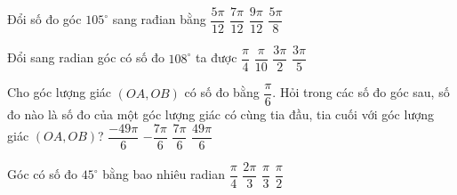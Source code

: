 \begin{ex}%
	Đổi số đo góc  $105^{\circ}$ sang rađian bằng
	 \choice
		{$\dfrac{5\pi}{12}$} 
		{\True  $\dfrac{7\pi}{12}$}
		{$\dfrac{9\pi}{12}$} 
		 {$\dfrac{5\pi}{8}$}
	 \loigiai{
		\[105^{\circ}=\dfrac{105^{\circ}\cdot  \pi}{180^{\circ}}=\dfrac{7\pi}{12}.
		\] 
	} 
\end{ex}

\begin{ex}%
	Đổi sang radian góc có số đo $108^\circ$ ta được 
	 \choice
		{$\dfrac{\pi}{4}$} 
		{$\dfrac{\pi}{10}$} 
		 {$\dfrac{3\pi}{2}$}
		 {\True $\dfrac{3\pi}{5}$}
\end{ex}

\begin{ex}%
	Cho góc lượng giác $(OA,OB)$ có số đo bằng $\dfrac{\pi}{6}$. Hỏi  trong các số đo góc sau, số đo nào là số đo của một góc lượng giác có cùng tia đầu, tia cuối với góc lượng giác $(OA,OB)$?
	 \choice
		 {$\dfrac{-49\pi}{6}$}
		{$-\dfrac{7\pi}{6}$} 
		{$\dfrac{7\pi}{6}$} 
		 {\True $\dfrac{49\pi}{6}$}
\end{ex}

\begin{ex}%
	Góc có số đo $45^{\circ}$ bằng bao  nhiêu radian
	 \choice
		{\True $\dfrac{\pi}{4}$} 
		 {$\dfrac{2\pi}{3}$}
		 {$\dfrac{\pi}{3}$}
		 {$\dfrac{\pi}{2}$}
\end{ex}


